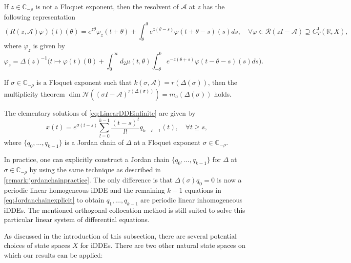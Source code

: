 \documentclass[english]{myarticle}
\begin{document}
\begin{sloppypar}
\begin{corollary}
If $z \in \mathbb{C}_{-\rho}$ is not a Floquet exponent, then the resolvent of $\mathcal{A}$ at $z$ has the following representation
\begin{equation*}
    (R(z,\mathcal{A}) \varphi)(t)(\theta) = e^{z \theta} \varphi_z(t+\theta) + \int_\theta^0 e^{z(\theta-s)} \varphi(t+\theta-s)(s) ds, \quad \forall \varphi \in \mathcal{R}(zI-\mathcal{A}) \supseteq C_T^1(\mathbb{R},X),
\end{equation*}
where $\varphi_z$ is given by
\begin{equation*}
    \varphi_z = \Delta(z)^{-1} \bigg( t \mapsto \varphi(t)(0) + \int_0^\infty d_2 \mu(t,\theta)\int_{-\theta}^{0} e^{-z(\theta + s)} \varphi(t -\theta - s)(s) ds \bigg).
\end{equation*}
\end{corollary}

\begin{corollary}
If $\sigma \in \mathbb{C}_{-\rho}$ is a Floquet exponent such that $k(\sigma,\mathcal{A}) = r(\Delta(\sigma))$, then the multiplicity theorem $\dim \mathcal{N}((\sigma I - \mathcal{A})^{r(\Delta(\sigma))}) =  m_a(\Delta(\sigma))$ holds.
\end{corollary}

\begin{corollary} \label{cor:FloquetsolDDEinfinite}
    The elementary solutions of \eqref{eq:LinearDDEinfinite} are given by
    \begin{equation*}
        x(t) = e^{\sigma(t-s)} \sum_{l=0}^{k-1} \frac{(t-s)^l}{l!}q_{k-l-1}(t), \quad \forall t \geq s,
    \end{equation*}
where $\{ {q}_{0},\dots,{q}_{k-1} \}$ is a Jordan chain of $\Delta$ at a Floquet exponent $\sigma \in \mathbb{C}_{-\rho}$.
\end{corollary}

In practice, one can explicitly construct a Jordan chain $\{q_0,\dots,q_{k-1}\}$ for $\Delta$ at $\sigma \in \mathbb{C}_{-\rho}$ by using the same technique as described in \cref{remark:jordanchainpractice}. The only difference is that $\Delta(\sigma)q_0 = 0$ is now a periodic linear homogeneous iDDE and the remaining $k-1$ equations in \eqref{eq:Jordanchainexplicit} to obtain $q_1,\dots,q_{k-1}$ are periodic linear inhomogeneous iDDEs. The mentioned orthogonal collocation method is still suited to solve this particular linear system of differential equations.

\begin{remark} \label{remark:statespaceinfdelay}
As discussed in the introduction of this subsection, there are several potential choices of state spaces $X$ for iDDEs. There are two other natural state spaces on which our results can be applied:


\end{remark}
\end{sloppypar}
\end{document}
